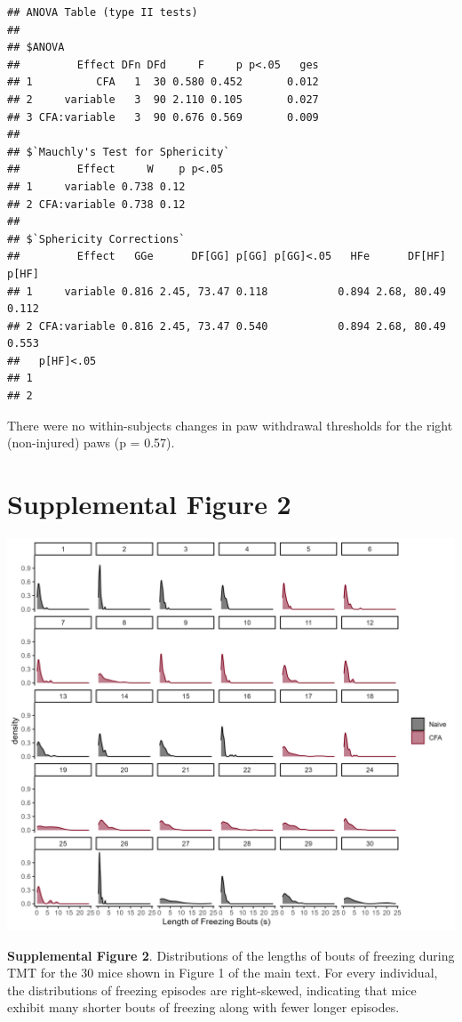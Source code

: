 \documentclass[
]{book}
\begin{document}
\begin{verbatim}
## ANOVA Table (type II tests)
## 
## $ANOVA
##         Effect DFn DFd     F     p p<.05   ges
## 1          CFA   1  30 0.580 0.452       0.012
## 2     variable   3  90 2.110 0.105       0.027
## 3 CFA:variable   3  90 0.676 0.569       0.009
## 
## $`Mauchly's Test for Sphericity`
##         Effect     W    p p<.05
## 1     variable 0.738 0.12      
## 2 CFA:variable 0.738 0.12      
## 
## $`Sphericity Corrections`
##         Effect   GGe      DF[GG] p[GG] p[GG]<.05   HFe      DF[HF] p[HF]
## 1     variable 0.816 2.45, 73.47 0.118           0.894 2.68, 80.49 0.112
## 2 CFA:variable 0.816 2.45, 73.47 0.540           0.894 2.68, 80.49 0.553
##   p[HF]<.05
## 1          
## 2
\end{verbatim}

There were no within-subjects changes in paw withdrawal thresholds for the right (non-injured) paws (p = 0.57).

\chapter*{Supplemental Figure 2}\label{supplemental-figure-2}

\includegraphics[width=33.33in]{Figs/S2_Individuals_Frz}

\textbf{Supplemental Figure 2}. Distributions of the lengths of bouts of freezing during TMT for the 30 mice shown in Figure 1 of the main text. For every individual, the distributions of freezing episodes are right-skewed, indicating that mice exhibit many shorter bouts of freezing along with fewer longer episodes.
\end{document}
